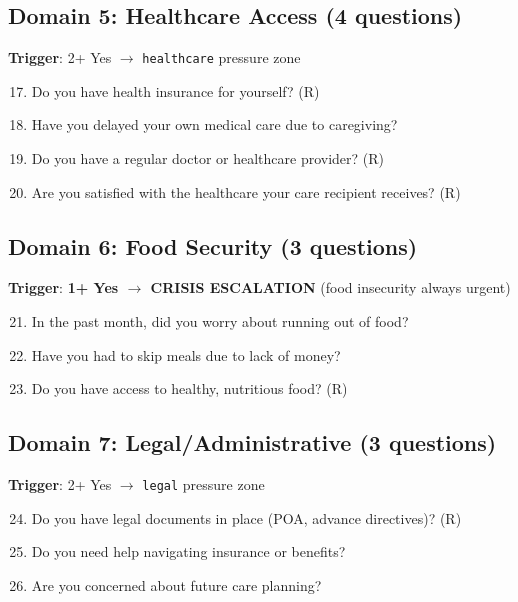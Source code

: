 \documentclass{article}
\begin{document}
\subsection*{Domain 5: Healthcare Access (4 questions)}
\textbf{Trigger}: 2+ Yes $\rightarrow$ \texttt{healthcare} pressure zone

\begin{enumerate}
    \setcounter{enumi}{16}
    \item Do you have health insurance for yourself? (R)
    \item Have you delayed your own medical care due to caregiving?
    \item Do you have a regular doctor or healthcare provider? (R)
    \item Are you satisfied with the healthcare your care recipient receives? (R)
\end{enumerate}

\subsection*{Domain 6: Food Security (3 questions)}
\textbf{Trigger}: \textbf{1+ Yes $\rightarrow$ CRISIS ESCALATION} (food insecurity always urgent)

\begin{enumerate}
    \setcounter{enumi}{20}
    \item In the past month, did you worry about running out of food?
    \item Have you had to skip meals due to lack of money?
    \item Do you have access to healthy, nutritious food? (R)
\end{enumerate}

\subsection*{Domain 7: Legal/Administrative (3 questions)}
\textbf{Trigger}: 2+ Yes $\rightarrow$ \texttt{legal} pressure zone

\begin{enumerate}
    \setcounter{enumi}{23}
    \item Do you have legal documents in place (POA, advance directives)? (R)
    \item Do you need help navigating insurance or benefits?
    \item Are you concerned about future care planning?
\end{enumerate}
\end{document}
